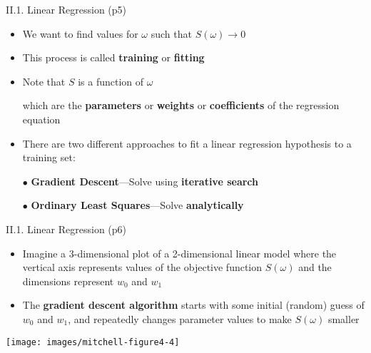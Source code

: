 \documentclass[handout]{beamer}
\newcommand{\strong}[1]{\textbf{\color{teal} #1}}
\newcommand{\stronger}[1]{\textbf{\color{purple} #1}}
\begin{document}
\begin{frame}{II.1. Linear Regression (p5)}
\begin{itemize}
\item We want to find values for $\omega$ such that $S(\omega) \rightarrow 0$
\item This process is called \stronger{training} or \stronger{fitting}
\item Note that $S$ is a function of $\omega$
\item[] which are the \strong{parameters} or \strong{weights} or \strong{coefficients} of the regression equation
\item[]
\item There are two different approaches to fit a linear regression hypothesis to a training set:
\item[$\bullet$] \stronger{Gradient Descent}---Solve using \strong{iterative search}
\item[$\bullet$] \stronger{Ordinary Least Squares}---Solve \strong{analytically}
\end{itemize}
\end{frame}
\begin{frame}{II.1. Linear Regression (p6)}
\begin{itemize}
\item Imagine a 3-dimensional plot of a 2-dimensional linear model where the vertical axis represents values of the objective function $S(\omega)$ and the dimensions represent $w_0$ and $w_1$
\item The \stronger{gradient descent algorithm} starts with some initial (random) guess of $w_0$ and $w_1$, and repeatedly changes parameter values to make $S(\omega)$ smaller
\end{itemize}
\begin{center}
\texttt{[image: images/mitchell-figure4-4]}\\
\cite[Fig 4.4]{mitchell-book:1997}
\end{center}
\end{frame}
\end{document}
